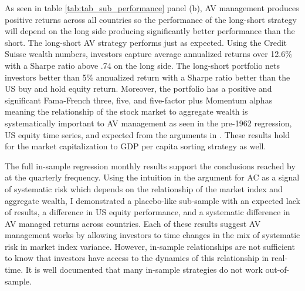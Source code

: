 As seen in table \ref{tab:tab_sub_performance} panel (b), AV management produces positive returns across all countries so the performance of the long-short strategy will depend on the long side producing significantly better performance than the short. The long-short AV strategy performs just as expected. Using the Credit Suisse wealth numbers, investors capture average annualized returns over 12.6\% with a Sharpe ratio above .74 on the long side. %
The long-short portfolio nets investors better than 5\% annualized return with a Sharpe ratio better than the US buy and hold equity return. Moreover, the portfolio has a positive and significant Fama-French three, five, and five-factor plus Momentum alphas meaning the relationship of the stock market to aggregate wealth is systematically important to AV management as seen in the pre-1962 regression, US equity time series, and expected from the arguments in \citet{pollet_average_2010}. These results hold for the market capitalization to GDP per capita sorting strategy as well.

The full in-sample regression monthly results support the conclusions reached by \citet{pollet_average_2010} at the quarterly frequency. Using the intuition in the argument for AC as a signal of systematic risk which depends on the relationship of the market index and aggregate wealth, I demonstrated a placebo-like sub-sample with an expected lack of results, a difference in US equity performance, and a systematic difference in AV managed returns across countries. Each of these results suggest AV management works by allowing investors to time changes in the mix of systematic risk in market index variance. However, in-sample relationships are not sufficient to know that investors have access to the dynamics of this relationship in real-time. It is well documented that many in-sample strategies do not work out-of-sample.